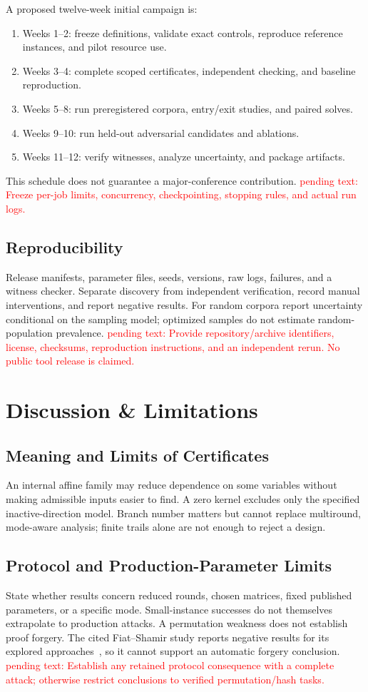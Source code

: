 \documentclass[conference]{IEEEtran}
\theoremstyle{definition}
\theoremstyle{plain}
\begin{document}
A proposed twelve-week initial campaign is:
\begin{enumerate}
\item Weeks 1--2: freeze definitions, validate exact controls, reproduce
reference instances, and pilot resource use.
\item Weeks 3--4: complete scoped certificates, independent checking,
and baseline reproduction.
\item Weeks 5--8: run preregistered corpora, entry/exit studies, and paired solves.
\item Weeks 9--10: run held-out adversarial candidates and ablations.
\item Weeks 11--12: verify witnesses, analyze uncertainty, and package artifacts.
\end{enumerate}
This schedule does not guarantee a major-conference contribution.
\textcolor{red}{pending text: Freeze per-job limits, concurrency,
checkpointing, stopping rules, and actual run logs.}

\subsection{Reproducibility}
Release manifests, parameter files, seeds, versions, raw logs, failures,
and a witness checker. Separate discovery from independent verification,
record manual interventions, and report negative results.
For random corpora report uncertainty conditional on the sampling model;
optimized samples do not estimate random-population prevalence.
\textcolor{red}{pending text: Provide repository/archive identifiers,
license, checksums, reproduction instructions, and an independent rerun.
No public tool release is claimed.}


\section{Discussion \& Limitations}
\label{sec:discussion}
\subsection{Meaning and Limits of Certificates}
An internal affine family may reduce dependence on some variables without
making admissible inputs easier to find. A zero kernel excludes only
the specified inactive-direction model. Branch number matters but cannot
replace multiround, mode-aware analysis; finite trails alone are not
enough to reject a design.
\subsection{Protocol and Production-Parameter Limits}
State whether results concern reduced rounds, chosen matrices, fixed
published parameters, or a specific mode. Small-instance successes
\cite{cryptoeprint:2026/150} do not themselves extrapolate to production
attacks. A permutation weakness does not establish proof forgery.
The cited Fiat--Shamir study reports negative results for its explored
approaches~\cite{cryptoeprint:2026/409}, so it cannot support an automatic
forgery conclusion.
\textcolor{red}{pending text: Establish any retained protocol consequence
with a complete attack; otherwise restrict conclusions to verified
permutation/hash tasks.}
\end{document}
